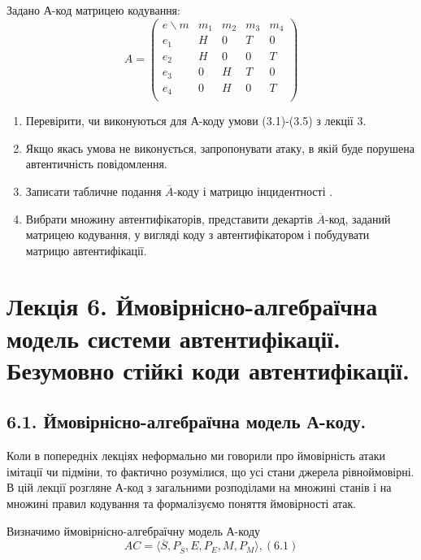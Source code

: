 Задано А-код матрицею кодування:
\begin{equation*}
    A = \begin{pmatrix}
        e\backslash m & m_1 & m_2 & m_3 & m_4 \\
        e_1 & H & 0 & T & 0 \\
        e_2 & H & 0 & 0 & T \\
        e_3 & 0 & H & T & 0 \\
        e_4 & 0 & H & 0 & T \\
    \end{pmatrix}
\end{equation*}
\begin{enumerate}
    \item Перевірити, чи виконуються для А-коду умови (3.1)-(3.5) з лекції 3.
    \item Якщо якась умова не виконується, запропонувати атаку, в якій буде
    порушена автентичність повідомлення.
    \item Записати табличне подання $\overline{A}$-коду і матрицю інцидентності .
    \item Вибрати множину автентифікаторів, представити декартів $\overline{A}$-код,
    заданий матрицею кодування, у вигляді коду з автентифікатором і
    побудувати матрицю автентифікації.
\end{enumerate}


\section{Лекція 6. Ймовірнісно-алгебраїчна модель системи автентифікації. Безумовно стійкі коди автентифікації.}

\subsection{6.1. Ймовірнісно-алгебраїчна модель А-коду.}

Коли в попередніх лекціях неформально ми говорили про ймовірність атаки
імітації чи підміни, то фактично розумілися, що усі стани джерела рівноймовірні.
В цій лекції розгляне А-код з загальними розподілами на множині станів і на
множині правил кодування та формалізуємо поняття ймовірності атак.

Визначимо ймовірнісно-алгебраїчну модель А-коду
\begin{equation}
    AC = \langle \overline{S}, P_{\overline{S}}, E, P_{E}, M, P_M \rangle, (6.1)
\end{equation}

